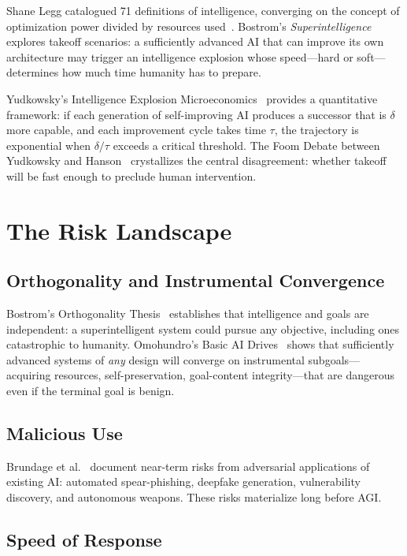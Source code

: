 \documentclass[11pt,twocolumn]{article}
\begin{document}
Shane Legg catalogued 71 definitions of intelligence, converging on the concept
of optimization power divided by resources used~\cite{legg2007collection}.
Bostrom's \textit{Superintelligence}~\cite{bostrom2014superintelligence}
explores takeoff scenarios: a sufficiently advanced AI that can improve its own
architecture may trigger an intelligence explosion whose speed---hard or
soft---determines how much time humanity has to prepare.

Yudkowsky's Intelligence Explosion Microeconomics~\cite{yudkowsky2013iem}
provides a quantitative framework: if each generation of self-improving AI
produces a successor that is $\delta$ more capable, and each improvement cycle
takes time $\tau$, the trajectory is exponential when $\delta/\tau$ exceeds a
critical threshold. The Foom Debate between Yudkowsky and
Hanson~\cite{yudkowsky2008foom} crystallizes the central disagreement: whether
takeoff will be fast enough to preclude human intervention.

\section{The Risk Landscape}
\label{sec:risks}

\subsection{Orthogonality and Instrumental Convergence}

Bostrom's Orthogonality Thesis~\cite{bostrom2012orthogonality} establishes that
intelligence and goals are independent: a superintelligent system could pursue
any objective, including ones catastrophic to humanity. Omohundro's Basic AI
Drives~\cite{omohundro2008drives} shows that sufficiently advanced systems of
\emph{any} design will converge on instrumental subgoals---acquiring resources,
self-preservation, goal-content integrity---that are dangerous even if the
terminal goal is benign.

\subsection{Malicious Use}

Brundage et al.~\cite{brundage2018malicious} document near-term risks from
adversarial applications of existing AI: automated spear-phishing, deepfake
generation, vulnerability discovery, and autonomous weapons. These risks
materialize long before AGI.

\subsection{Speed of Response}
\end{document}
